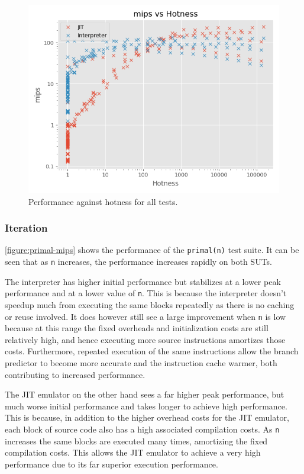 \begin{figure}[h]
    \centering
    \includegraphics[scale=0.75]{output/graphs/scatter/hotness.png}
    \caption{Performance against hotness for all tests.}
    \label{figure:hotness}
\end{figure}

\subsubsection{Iteration}

\autoref{figure:primal-mips} shows the performance of the \texttt{primal(n)} test suite. It can be seen that as \texttt{n} increases, the performance increases rapidly on both SUTs.

The interpreter has higher initial performance but stabilizes at a lower peak performance and at a lower value of \texttt{n}. This is because the interpreter doesn't speedup much from executing the same blocks repeatedly as there is no caching or reuse involved. It does however still see a large improvement when \texttt{n} is low because at this range the fixed overheads and initialization costs are still relatively high, and hence executing more source instructions amortizes those costs. Furthermore, repeated execution of the same instructions allow the branch predictor to become more accurate and the instruction cache warmer, both contributing to increased performance.

The JIT emulator on the other hand sees a far higher peak performance, but much worse initial performance and takes longer to achieve high performance. This is because, in addition to the higher overhead costs for the JIT emulator, each block of source code also has a high associated compilation costs. As \texttt{n} increases the same blocks are executed many times, amortizing the fixed compilation costs. This allows the JIT emulator to achieve a very high performance due to its far superior execution performance.

